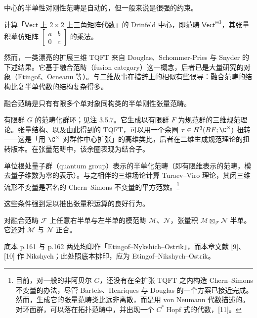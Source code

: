 中心的半单性对刚性范畴是自动的，但一般来说是很强的约束。

\begin{exercise}
计算「$\mathsf{Vect}$ 上 $2\times 2$ 上三角矩阵代数」的 Drinfeld 中心，即范畴 $\mathsf{Vect}^{\oplus3}$，其张量积摹仿矩阵 $\left[\begin{smallmatrix}a&b\\0&c\end{smallmatrix}\right]$ 的乘法。
\end{exercise}

然而，一类漂亮的扩展三维 TQFT 来自 Douglas、Schommer-Pries 与 Snyder 的下述结果。它基于融合范畴（fusion category）这一概念，后者已是大量研究的对象（Etingof、Ocneanu 等）。与二维故事在措辞上的相似有些误导：融合范畴的结构比复半单代数的结构复杂得多。

\begin{definition}
融合范畴是只有有限多个单对象同构类的半单刚性张量范畴。
\end{definition}

\begin{example}
有限群 $G$ 的范畴化群环；见注 3.5.7。它生成以有限群 $F$ 为规范群的三维规范理论。张量结构、以及由此得到的 TQFT，可以用一个余圈 $\tau\in H^3(BF;\C^\times)$ 扭转——这是「用 $\C^\times$ 对群作中心扩张」的高维类比，后者在二维生成规范理论的扭转版本。在张量范畴中，该余圈表现为结合子。

单位根处量子群（quantum group）表示的半单化范畴（即有限维表示的范畴，模去量子维数为零的表示）。与之相伴的三维场论计算 Turaev--Viro 理论，其闭三维流形不变量是著名的 Chern--Simons 不变量的平方范数。\footnote{目前，对一般的非阿贝尔 $G$，还没有在全扩张 TQFT 之内构造 Chern--Simons 不变量的办法，尽管 Bartels、Henriques 与 Douglas 的一个方案已接近完成。然而，生成它的张量范畴类比远非离散，而是用 von Neumann 代数描述的。对环面群，可以落在拓扑范畴中，并出现一个 $C^*$ Hopf 式的代数，[11]。}
\end{example}

这些条件强到足以推出张量积运算的良好行为。

\begin{theorem}
对融合范畴 $\mathcal{F}$ 上任意右半单与左半单的模范畴 $\mathcal{M}$、$\mathcal{N}$，张量积 $\mathcal{M}\boxtimes_{\mathcal{F}}\mathcal{N}$ 半单。它还对 $\mathcal{M}$ 与 $\mathcal{N}$ 正合。
\end{theorem}

\begin{annote}
底本 p.161 与 p.162 两处均印作「Etingof--Nykshich--Ostrik」，而本章文献 [9]、[10] 作 Nikshych；此处照底本排印，应为 Etingof--Nikshych--Ostrik。
\end{annote}

